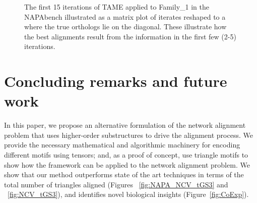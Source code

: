 \documentclass[10pt, journal, compsoc, final]{IEEEtran}
\begin{document}
\begin{figure*}[!t]
\centering
{}
\hfil
{}
\hfil
{}
\hfil
{}
\hfil
{}

\hfil
{}
\hfil
{}
\hfil
{}
\hfil
{}

\hfil
{}
\hfil
{}
\hfil
{}
\hfil
{}
\hfil

\caption{The first 15 iterations of TAME applied to Family\_1 in the NAPAbench illustrated
as a matrix plot of iterates  reshaped to a  where the true
orthologs lie on the diagonal. These illustrate how the best alignments result
from the information in the first few (2-5) iterations. }
\label{fig:NAPA_iterations}
\end{figure*}



\section{Concluding remarks and future work}

In this paper, we propose an alternative formulation of the network alignment problem that
uses higher-order substructures to drive the alignment process. We provide the 
necessary mathematical and algorithmic machinery for encoding different motifs using
tensors; and, as a proof of concept, use triangle motifs to show how the framework
can be applied to the network alignment problem. We show that our method
outperforms state of the art techniques in terms of the total number of triangles aligned (Figures ~\ref{fig:NAPA_NCV_tGS3} and ~\ref{fig:NCV_tGS3}), and identifies novel biological insights (Figure~\ref{fig:CoExp}).
\end{document}
